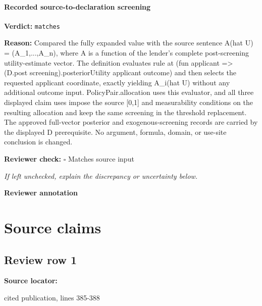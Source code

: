 \documentclass[10pt]{article}
\newcommand{\reviewerbox}{%
  \par\noindent\fbox{\parbox{0.96\linewidth}{\rule{0pt}{0.38in}}}\par
}
\newcommand{\reviewmatch}[1]{%
  \par\noindent\textbf{Reviewer check:} $\square$\; #1\par
  \noindent\emph{If left unchecked, explain the discrepancy or uncertainty below.}\par
}
\begin{document}
\paragraph{Recorded source-to-declaration screening}
\textbf{Verdict:} \texttt{matches}
\\
{\raggedright
\textbf{Reason:} Compared the fully expanded value with the source sentence A(hat U) = (A\_\allowbreak{}1,.\allowbreak{}.\allowbreak{}.\allowbreak{},A\_\allowbreak{}n), where A is a function of the lender's complete post-\allowbreak{}screening utility-\allowbreak{}estimate vector.\allowbreak{} The definition evaluates rule at (fun applicant => (D.\allowbreak{}post screening).\allowbreak{}posteriorUtility applicant outcome) and then selects the requested applicant coordinate, exactly yielding A\_\allowbreak{}i(hat U) without any additional outcome input.\allowbreak{} PolicyPair.\allowbreak{}allocation uses this evaluator, and all three displayed claim uses impose the source [0,1] and measurability conditions on the resulting allocation and keep the same screening in the threshold replacement.\allowbreak{} The approved full-\allowbreak{}vector posterior and exogenous-\allowbreak{}screening records are carried by the displayed D prerequisite.\allowbreak{} No argument, formula, domain, or use-\allowbreak{}site conclusion is changed.\allowbreak{}
\par}
\reviewmatch{Matches source input}
\noindent\textbf{Reviewer annotation}\par
\reviewerbox

\clearpage
\hypertarget{source-claim-17512b233837b061}{}
\hypertarget{source-section-f10b5f68e4acf3dc}{}
\section*{Source claims}
\subsection*{Review row 1}
\textbf{Source locator:} {\footnotesize\raggedright cited publication, lines 385-\allowbreak{}388\par}
\end{document}
